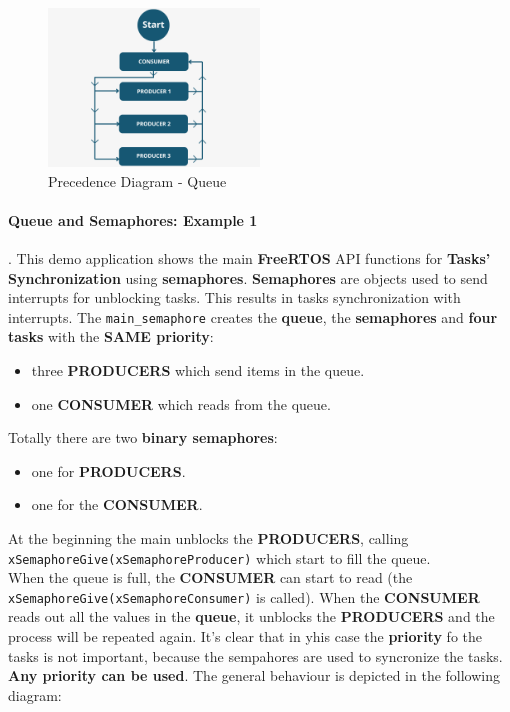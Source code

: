 \begin{figure}[H]
    \centering
    \includegraphics[width=0.5\textwidth]{img/main_queue.png}
    \caption{Precedence Diagram - Queue}
    \label{fig:Precedence Diagram - Queue}
\end{figure}


\paragraph{Queue and Semaphores: Example 1}.
\label{par:Queue and Semaphores 1}
This demo application shows the main \textbf{FreeRTOS} API functions for \textbf{Tasks' Synchronization} using \textbf{semaphores}. \textbf{Semaphores} are objects used to send interrupts for unblocking tasks. This results in tasks synchronization with interrupts.
The \texttt{main\_semaphore} creates the \textbf{queue}, the \textbf{semaphores} and \textbf{four tasks} with the \textbf{SAME priority}:
\begin{itemize}
    \item three \textbf{PRODUCERS} which send items in the queue.
    \item one \textbf{CONSUMER} which reads from the queue.
\end{itemize}
Totally there are two \textbf{binary semaphores}:
\begin{itemize}
    \item one for \textbf{PRODUCERS}.
    \item one for the \textbf{CONSUMER}.
\end{itemize}
At the beginning the main unblocks the \textbf{PRODUCERS}, calling \texttt{xSemaphoreGive(xSemaphoreProducer)} which start to fill the queue. \\ When the queue is full, the \textbf{CONSUMER} can start to read (the \texttt{xSemaphoreGive(xSemaphoreConsumer)} is called). When the \textbf{CONSUMER} reads out all the values in the \textbf{queue}, it unblocks the \textbf{PRODUCERS} and the process will be repeated again.
It's clear that in yhis case the \textbf{priority} fo the tasks is not important, because the sempahores are used to syncronize the tasks. \textbf{Any priority can be used}.
The general behaviour is depicted in the following diagram:

